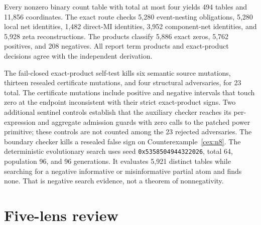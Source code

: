 \documentclass[11pt]{article}
\theoremstyle{definition}
\begin{document}
Every nonzero binary count table with total at most four yields 494 tables and 11,856 coordinates.
The exact route checks 5,280 event-nesting obligations, 5,280 local net identities, 1,482 direct-MI
identities, 3,952 component-net identities, and 5,928 zeta reconstructions.  The products classify
5,886 exact zeros, 5,762 positives, and 208 negatives.  All report term products and exact-product
decisions agree with the independent derivation.

The fail-closed exact-product self-test kills six semantic source mutations, thirteen resealed
certificate mutations, and four structural adversaries, for 23 total.  The certificate mutations
include positive and negative intervals that touch zero at the endpoint inconsistent with their
strict exact-product signs.  Two additional sentinel controls establish that the auxiliary
checker reaches its per-expression and aggregate admission guards with zero calls to the patched
power primitive; these controls are not counted among the 23 rejected adversaries.  The boundary
checker kills a resealed false sign on
Counterexample~\ref{cex:n8}.  The deterministic evolutionary search uses
seed \texttt{0x5358504944322026}, total 64, population 96, and 96 generations.  It evaluates 5,921
distinct tables while searching for a negative informative or misinformative partial atom and
finds none.  That is negative search evidence, not a theorem of nonnegativity.

\section{Five-lens review}
\end{document}
